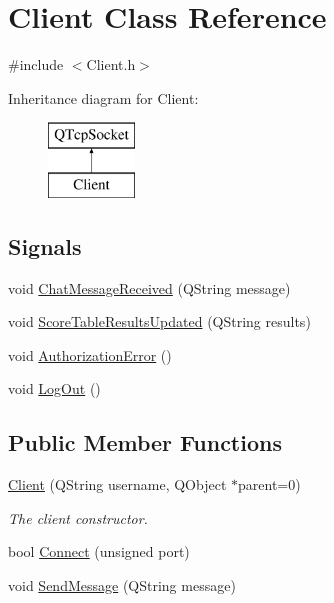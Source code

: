 \hypertarget{class_client}{\section{Client Class Reference}
\label{class_client}
}


{\ttfamily \#include $<$Client.\-h$>$}

Inheritance diagram for Client\-:\begin{figure}[H]
\begin{center}
\leavevmode
\includegraphics[height=2.000000cm]{class_client}
\end{center}
\end{figure}
\subsection*{Signals}
\begin{DoxyCompactItemize}
\item 
void \hyperlink{class_client_ab7bd1cdd78e0a488cf3f0424ced25c56}{Chat\-Message\-Received} (Q\-String message)
\item 
void \hyperlink{class_client_af5d7d3f9774f38235ebc904e9030ce2e}{Score\-Table\-Results\-Updated} (Q\-String results)
\item 
void \hyperlink{class_client_adc8e44dd81c568518383c6078f3335e5}{Authorization\-Error} ()
\item 
void \hyperlink{class_client_ab933a5ebdc0bcf97ea6c4d8cbb0ffb94}{Log\-Out} ()
\end{DoxyCompactItemize}
\subsection*{Public Member Functions}
\begin{DoxyCompactItemize}
\item 
\hyperlink{class_client_adb0af80eef174ae39ee30dd7565659f8}{Client} (Q\-String username, Q\-Object $\ast$parent=0)
\begin{DoxyCompactList}\small\item\em The client constructor. \end{DoxyCompactList}\item 
bool \hyperlink{class_client_a958fe0409b3ee35c4a84779ec556ad88}{Connect} (unsigned port)
\item 
void \hyperlink{class_client_a57df544a36437362482b5eeab936ea6f}{Send\-Message} (Q\-String message)
\end{DoxyCompactItemize}



